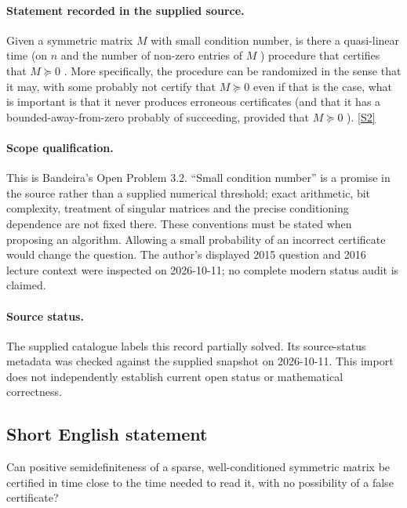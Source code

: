 \documentclass[11pt]{article}
\begin{document}
\paragraph{Statement recorded in the supplied source.}
Given a symmetric matrix ${M}$ with small condition number, is there a quasi-linear time (on ${n}$ and the number of non-zero entries of ${M}$ ) procedure that certifies that ${M\succeq 0}$ . More specifically, the procedure can be randomized in the sense that it may, with some probably not certify that ${M\succeq 0}$ even if that is the case, what is important is that it never produces erroneous certificates (and that it has a bounded-away-from-zero probably of succeeding, provided that ${M\succeq 0}$ ). \href{https://afonsobandeira.wordpress.com/2015/10/05/10l42pcheeger/}{[S2]}
\paragraph{Scope qualification.}
This is Bandeira's Open Problem 3.2. ``Small condition number'' is a promise in the source rather than a supplied numerical threshold; exact arithmetic, bit complexity, treatment of singular matrices and the precise conditioning dependence are not fixed there. These conventions must be stated when proposing an algorithm. Allowing a small probability of an incorrect certificate would change the question. The author's displayed 2015 question and 2016 lecture context were inspected on 2026-10-11; no complete modern status audit is claimed.
\paragraph{Source status.}
The supplied catalogue labels this record partially solved. Its source-status metadata was checked against the supplied snapshot on 2026-10-11. This import does not independently establish current open status or mathematical correctness.
\subsection{Short English statement}
Can positive semidefiniteness of a sparse, well-conditioned symmetric matrix be certified in time close to the time needed to read it, with no possibility of a false certificate?
\end{document}
